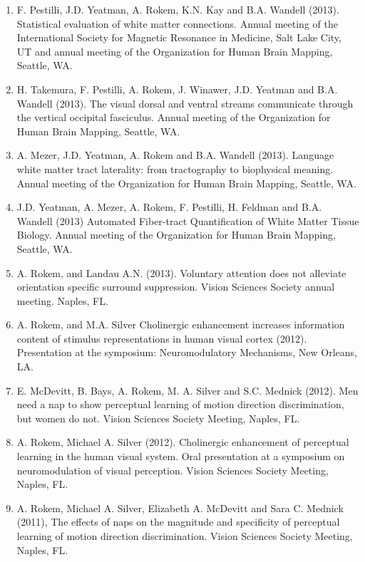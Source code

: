 \documentclass[11pt,fullpage]{article}
\begin{document}
\begin{enumerate}
\item F. Pestilli, J.D. Yeatman, A. Rokem, K.N. Kay and B.A. Wandell (2013). Statistical evaluation of white matter connections. Annual meeting of the International Society for Magnetic Resonance in Medicine, Salt Lake City, UT and annual meeting of the Organization for Human Brain Mapping, Seattle, WA.

\item H. Takemura, F. Pestilli, A. Rokem, J. Winawer, J.D. Yeatman and B.A. Wandell (2013). The visual dorsal and ventral streams communicate through the vertical occipital fasciculus. Annual meeting of the Organization for Human Brain Mapping, Seattle, WA.

\item A. Mezer, J.D. Yeatman, A. Rokem and B.A. Wandell (2013). Language white matter tract laterality: from tractography to biophysical meaning. Annual meeting of the Organization for Human Brain Mapping, Seattle, WA.

\item J.D. Yeatman, A. Mezer, A. Rokem, F. Pestilli, H. Feldman and B.A. Wandell (2013) Automated Fiber-tract Quantification of White Matter Tissue Biology. Annual meeting of the Organization for Human Brain Mapping, Seattle, WA.

\item A. Rokem, and Landau A.N. (2013). Voluntary attention does not alleviate orientation specific surround suppression. Vision Sciences Society annual meeting. Naples, FL.

\item A. Rokem, and M.A. Silver Cholinergic enhancement increases information content of stimulus representations in human visual cortex (2012). Presentation at the symposium: Neuromodulatory Mechanisms, New Orleans, LA.

\item E. McDevitt, B. Bays, A. Rokem, M. A. Silver and S.C. Mednick (2012). Men need a nap to show perceptual learning of motion direction discrimination, but women do not. Vision Sciences Society Meeting, Naples, FL.

\item A. Rokem, Michael A. Silver (2012). Cholinergic enhancement of perceptual learning in the human visual system. Oral presentation at a symposium on neuromodulation of visual perception. Vision Sciences Society Meeting, Naples, FL.

\item A. Rokem, Michael A. Silver, Elizabeth A. McDevitt and Sara C. Mednick (2011), The effects of naps on the magnitude and specificity of perceptual learning of motion direction discrimination. Vision Sciences Society Meeting, Naples, FL.


\end{enumerate}
\end{document}
